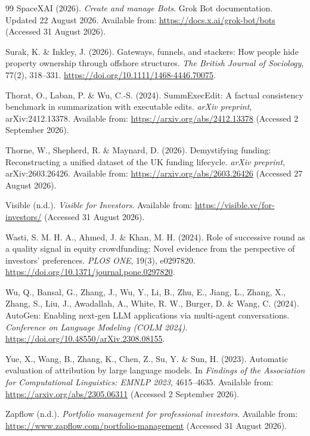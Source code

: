 \begin{thebibliography}{99}
SpaceXAI (2026).
\emph{Create and manage Bots}. Grok Bot documentation.
Updated 22 August 2026. Available from: \url{https://docs.x.ai/grok-bot/bots}
(Accessed 31 August 2026).

Surak, K. \& Inkley, J. (2026).
Gateways, funnels, and stackers: How people hide property ownership through offshore structures.
\emph{The British Journal of Sociology}, 77(2), 318--331.
\url{https://doi.org/10.1111/1468-4446.70075}.

Thorat, O., Laban, P. \& Wu, C.-S. (2024).
SummExecEdit: A factual consistency benchmark in summarization with executable edits.
\emph{arXiv preprint}, arXiv:2412.13378.
Available from: \url{https://arxiv.org/abs/2412.13378} (Accessed 2 September 2026).

Thorne, W., Shepherd, R. \& Maynard, D. (2026).
Demystifying funding: Reconstructing a unified dataset of the UK funding lifecycle.
\emph{arXiv preprint}, arXiv:2603.26426.
Available from: \url{https://arxiv.org/abs/2603.26426} (Accessed 27 August 2026).

Visible (n.d.).
\emph{Visible for Investors}.
Available from: \url{https://visible.vc/for-investors/} (Accessed 31 August 2026).

Wasti, S. M. H. A., Ahmed, J. \& Khan, M. H. (2024).
Role of successive round as a quality signal in equity crowdfunding: Novel evidence from the
perspective of investors' preferences. \emph{PLOS ONE}, 19(3), e0297820.
\url{https://doi.org/10.1371/journal.pone.0297820}.

Wu, Q., Bansal, G., Zhang, J., Wu, Y., Li, B., Zhu, E., Jiang, L., Zhang, X., Zhang, S., Liu, J.,
Awadallah, A., White, R. W., Burger, D. \& Wang, C. (2024).
AutoGen: Enabling next-gen LLM applications via multi-agent conversations.
\emph{Conference on Language Modeling (COLM 2024)}.
\url{https://doi.org/10.48550/arXiv.2308.08155}.

Yue, X., Wang, B., Zhang, K., Chen, Z., Su, Y. \& Sun, H. (2023).
Automatic evaluation of attribution by large language models.
In \emph{Findings of the Association for Computational Linguistics: EMNLP 2023}, 4615--4635.
Available from: \url{https://arxiv.org/abs/2305.06311} (Accessed 2 September 2026).

Zapflow (n.d.).
\emph{Portfolio management for professional investors}.
Available from: \url{https://www.zapflow.com/portfolio-management}
(Accessed 31 August 2026).
\end{thebibliography}

